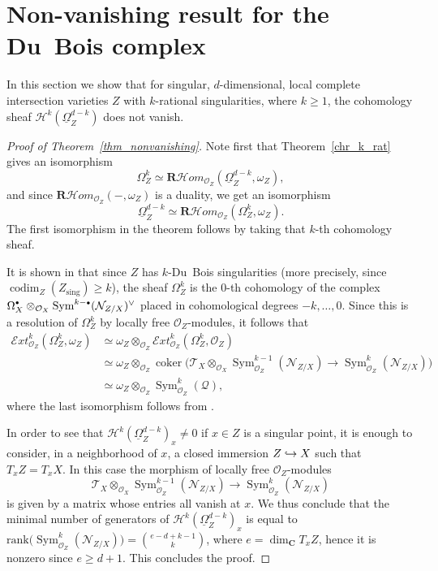 \documentclass[11pt]{article}
\numberwithin{equation}{section}
\newcommand\hto{\mathrel{\lhook\joinrel\to}}
\newcommand{\sbullet}{{\scriptscriptstyle\bullet}}
\newcommand{\csbullet}{{\raisebox{1pt}{$\sbullet$}}}
\theoremstyle{plain}
\theoremstyle{definition}
\newcommand\R{{\mathbf R}}
\newcommand\C{{\mathbf C}}
\newcommand\cH{\mathcal{H}}
\newcommand\cO{\mathcal{O}}
\newcommand\cH{\mathcal{H}}
\newcommand\cO{\mathcal{O}}
\newcommand\sing{\mathrm{sing}}
\DeclareMathOperator{\codim}{codim}
\DeclareMathOperator{\coker}{coker}
\DeclareMathOperator{\Sym}{Sym}
\begin{document}
\section{Non-vanishing result for the Du~Bois complex}\label{section_nonvanishing}

In this section we show that for singular, $d$-dimensional, local complete intersection varieties $Z$ with $k$-rational singularities, where $k\geq 1$,
the cohomology sheaf $\cH^k(\underline{\Omega}_Z^{d-k})$ does not vanish.

\begin{proof}[Proof of Theorem~\ref{thm_nonvanishing}]
Note first that Theorem~\ref{chr_k_rat} gives an isomorphism
\[\Omega_Z^k\simeq \R\cH om_{\cO_Z}(\underline{\Omega}_Z^{d-k},\omega_Z),\]
and since $\R\cH om_{\cO_Z}(-,\omega_Z)$ is a duality, we get an isomorphism
\[\underline{\Omega}_Z^{d-k}\simeq \R\cH om_{\cO_Z}(\Omega_Z^k,\omega_Z).\]
The first isomorphism in the theorem follows by taking that $k$-th cohomology sheaf.

It is shown in \cite[\S 5.2]{MP1} that since
$Z$ has $k$-Du~Bois singularities (more precisely, since $\codim_Z(Z_\sing)\geq k$), the sheaf $\Omega_Z^k$ is the $0$-th
cohomology of the complex \hbox{$\Omega_X^{\csbullet} \otimes_{\cO_X} \Sym^{k-\sbullet}({\mathcal N}_{Z/X})^{\vee}$} placed in cohomological degrees $-k,\ldots,0$. Since this is a resolution of $\Omega_Z^k$ by locally free $\cO_Z$-modules, it follows that
\begin{align*}
{\mathcal Ext}^k_{\cO_Z}(\Omega_Z^k,\omega_Z)&\simeq \omega_Z\otimes_{\cO_Z}{\mathcal Ext}^k_{\cO_Z}(\Omega_Z^k,\cO_Z)\\
&\simeq\omega_Z\otimes_{\cO_Z} \coker\big({\mathcal T}_X\otimes_{\cO_X}\Sym_{\cO_Z}^{k-1}({\mathcal N}_{Z/X})\to
\Sym_{\cO_Z}^{k}({\mathcal N}_{Z/X})\big)\\
&\simeq \omega_Z\otimes_{\cO_Z}\Sym^k_{\cO_Z}({\mathcal Q}),
\end{align*}
where the last isomorphism follows from \cite[Prop.\,A2.2(d)]{DE}.

In order to see that $\cH^k(\underline{\Omega}_Z^{d-k})_x\neq 0$ if $x\in Z$ is a singular point, it is enough to consider, in a neighborhood of $x$,
a closed immersion $Z\hto X$ such that $T_xZ=T_xX$. In this case the morphism of locally free $\cO_Z$-modules
\[{\mathcal T}_X\otimes_{\cO_X}\Sym_{\cO_Z}^{k-1}({\mathcal N}_{Z/X})\to
\Sym_{\cO_Z}^{k}({\mathcal N}_{Z/X})\]
is given by a matrix whose entries all vanish at $x$. We thus conclude that the minimal number of generators of
$\cH^k(\underline{\Omega}_Z^{d-k})_x$ is equal to $\mathrm{rank}\big(\Sym_{\cO_Z}^k({\mathcal N}_{Z/X})\big)=\binom{e-d+k-1}{k}$,
where $e=\dim_{\C}T_xZ$, hence it is nonzero since $e\geq d+1$. This concludes the proof.
\end{proof}
\end{document}
